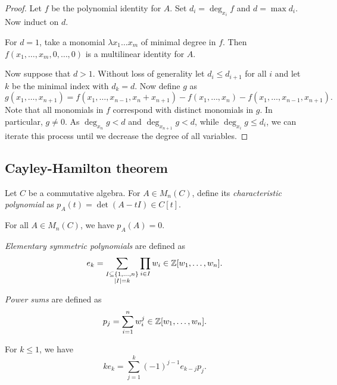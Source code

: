\begin{proof}
Let $f$ be the polynomial identity for $A$. Set
$d_i = \deg_{x_i} f$ and $d = \max d_i$. Now induct on $d$.

For $d = 1$, take a monomial $\lambda x_1 \dots x_m$ of minimal
degree in $f$. Then $f(x_1, \dots, x_m, 0, \dots, 0)$ is a
multilinear identity for $A$.

Now suppose that $d > 1$. Without loss of generality let
$d_i \leq d_{i+1}$ for all $i$ and let $k$ be the minimal index
with $d_k = d$. Now define $g$ as
\[
g(x_1, \dots, x_{n+1}) =
f(x_1, \dots, x_{n-1}, x_n + x_{n+1}) -
f(x_1, \dots, x_n) - f(x_1, \dots, x_{n-1}, x_{n+1}).
\]
Note that all monomials in $f$ correspond with distinct monomials
in $g$. In particular, $g \ne 0$. As $\deg_{x_n} g < d$ and
$\deg_{x_{n+1}} g < d$, while $\deg_{x_i} g \leq d_i$, we can
iterate this process until we decrease the degree of all variables.
\end{proof}

\newpage

\subsection{Cayley-Hamilton theorem}

\begin{definicija}
Let $C$ be a commutative algebra. For $A \in M_n(C)$, define its
\emph{characteristic polynomial}
as $p_A(t) = \det(A - tI) \in C[t]$.
\end{definicija}

\begin{izrek}
For all $A \in M_n(C)$, we have $p_A(A) = 0$.
\end{izrek}

\begin{definicija}
\emph{Elementary symmetric polynomials}
are defined as
\[
e_k =
\sum_{\substack{I \subseteq \left\{1, \dots, n\right\} \\ \left\lvert I\right\rvert = k}}
\prod_{i \in I} w_i \in
\mathbb{Z}[w_1, \dots, w_n].
\]
\end{definicija}

\begin{definicija}
\emph{Power sums} are defined as
\[
p_j = \sum_{i=1}^n w_i^j \in \mathbb{Z}[w_1, \dots, w_n].
\]
\end{definicija}

\begin{izrek}
For $k \leq 1$, we have
\[
k e_k = \sum_{j=1}^k (-1)^{j-1} e_{k-j} p_j.
\]
\end{izrek}

